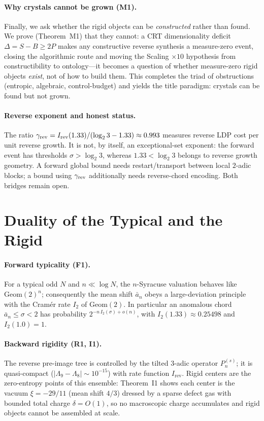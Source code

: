\documentclass[12pt,a4paper]{article}
\begin{document}
\paragraph{Why crystals cannot be grown (M1).}
Finally, we ask whether the rigid objects can be \emph{constructed} rather than
found. We prove (Theorem~M1) that they cannot: a CRT dimensionality deficit
$\Delta=S-B\ge2P$ makes any constructive reverse synthesis a measure-zero
event, closing the algorithmic route and moving the Scaling $\times10$
hypothesis from constructibility to ontology---it becomes a question of whether
measure-zero rigid objects \emph{exist}, not of how to build them. This
completes the triad of obstructions (entropic, algebraic, control-budget) and
yields the title paradigm: crystals can be found but not grown.

\paragraph{Reverse exponent and honest status.}
The ratio
$\gamma_{\rm rev}=I_{\rm rev}(1.33)/(\log_2 3-1.33)\approx0.993$
measures reverse LDP cost per unit reverse growth.  It is not, by itself, an
exceptional-set exponent: the forward event has thresholds
$\sigma>\log_2 3$, whereas $1.33<\log_2 3$ belongs to reverse growth geometry.
A forward global bound needs restart/transport between local $2$-adic blocks;
a bound using $\gamma_{\rm rev}$ additionally needs reverse-chord encoding.
Both bridges remain open.

\section{Duality of the Typical and the Rigid}

\paragraph{Forward typicality (F1).} For a typical odd $N$ and $n\ll\log N$,
the $n$-Syracuse valuation behaves like $\mathrm{Geom}(2)^n$; consequently the
mean shift $\bar a_n$ obeys a large-deviation principle with the Cram\'er rate
$I_2$ of $\mathrm{Geom}(2)$. In particular an anomalous chord
$\bar a_n\le\sigma<2$ has probability $2^{-n\,I_2(\sigma)+o(n)}$, with
$I_2(1.33)\approx0.25498$ and $I_2(1.0)=1$.

\paragraph{Backward rigidity (R1, I1).} The reverse pre-image tree is
controlled by the tilted $3$-adic operator $P_n^{(s)}$; it is quasi-compact
($|\Lambda_9-\Lambda_8|\sim10^{-15}$) with rate function $I_{\mathrm{rev}}$.
Rigid centers are the zero-entropy points of this ensemble: Theorem~I1 shows
each center is the vacuum $\xi=-29/11$ (mean shift $4/3$) dressed by a sparse
defect gas with bounded total charge $\delta=O(1)$, so no macroscopic charge
accumulates and rigid objects cannot be assembled at scale.
\end{document}
